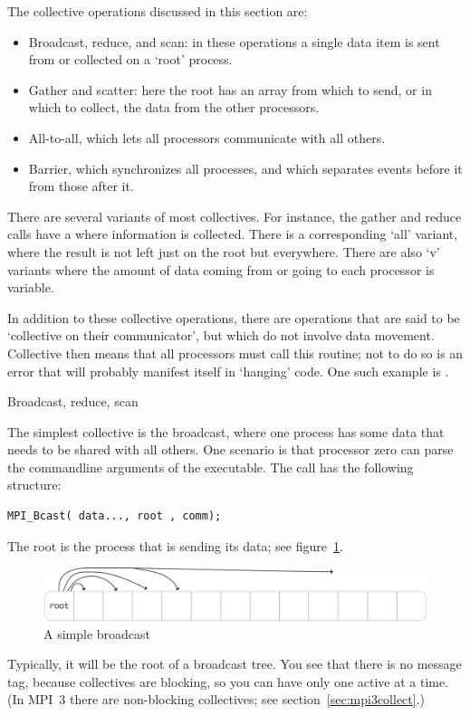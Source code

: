The collective operations discussed in this section are:
\begin{itemize}
\item Broadcast, reduce, and scan: in these operations a single data
  item is sent from or collected on a `root' process.
\item Gather and scatter: here the root has an array from which to
  send, or in which to collect, the data from the other processors.
\item All-to-all, which lets all processors communicate with all others.
\item Barrier, which synchronizes all processes, and which separates
  events before it from those after it.
\end{itemize}
There are several variants of most collectives. For instance, the
gather and reduce calls have
a  where
information is collected.  There is a corresponding `all' variant,
where the result is not left just on the root but everywhere. 
There are also `v' variants where the
amount of data coming from or going to each processor is variable.

In addition to these collective operations, there are operations that
are said to be `collective on their communicator', but which do not
involve data movement. Collective then means that all processors must
call this routine; not to do so is an error that will probably
manifest itself in `hanging' code. One such example is
.

 {Broadcast, reduce, scan}
\label{sec:bcast}

The simplest collective is the broadcast, where one process has some
data that needs to be shared with all others. One scenario is that
processor zero can parse the commandline arguments of the executable.
The call has the following structure:
\begin{verbatim}
MPI_Bcast( data..., root , comm);
\end{verbatim}
The root is the process that is sending its data; see figure~\ref{fig:bcast-simple}.
\begin{figure}[ht]
  \includegraphics[scale=.08]{graphics/bcast-simple}
  \caption{A simple broadcast}
  \label{fig:bcast-simple}
\end{figure}
Typically, it will
be the root of a broadcast tree. You see that there is no message tag,
because collectives are blocking, so you can have only one active at a
time. (In MPI~3 there are non-blocking collectives; see
section~\ref{sec:mpi3collect}.)

